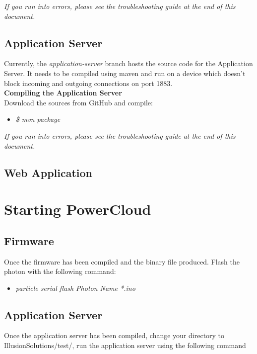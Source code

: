 \documentclass[a4paper,10pt]{article}
\begin{document}
	\textit{If you run into errors, please see the troubleshooting guide at the end of this document.}
	
	\subsection{Application Server}
	Currently, the \textit{application-server} branch hosts the source code for 
	the Application Server. It needs to be compiled using maven and run on a 
	device which doesn't block incoming and outgoing connections on port 1883.\\
	
	\textbf{Compiling the Application Server}\\
	Download the sources from GitHub and compile:\\
	
	\begin{itemize}
		\item \textit{\$ mvn package}
	\end{itemize}		
	
	\textit{If you run into errors, please see the troubleshooting guide at the end of this document.}
	\newpage
	\subsection{Web Application}
	
	\newpage
	\section{Starting PowerCloud}
	\subsection{Firmware}
	Once the firmware has been compiled and the binary file produced. Flash the photon with the following command:
	
	\begin{itemize}
		\item \textit{particle serial flash Photon Name *.ino}
	\end{itemize}
	
	\subsection{Application Server}
	Once the application server has been compiled, change your directory to IllusionSolutions/test/, run the application server using the following command
	
\end{document}
